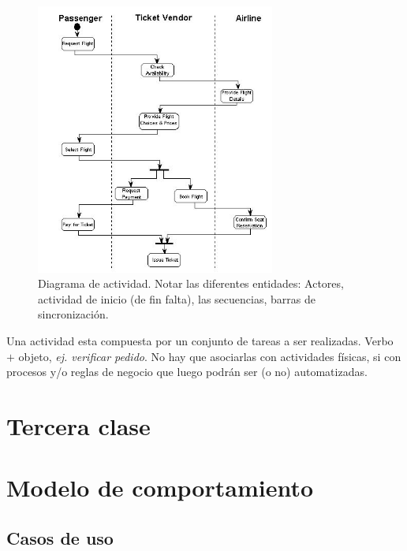 \documentclass[titlepage,a4paper]{article}
\begin{document}
    \begin{figure}[!htb]
        \centering
        \includegraphics[width=0.7\textwidth]{Imagenes/DiagramaActividad.png}
        \caption{Diagrama de actividad. Notar las diferentes entidades: Actores, actividad de inicio (de fin falta), las secuencias, barras de sincronización.}
    \end{figure}

Una actividad esta compuesta por un conjunto de tareas a ser realizadas. Verbo $+$ objeto, \textit{ej. verificar pedido}. No hay que asociarlas con actividades físicas, si con procesos y/o reglas de negocio que luego podrán ser (o no) automatizadas.



\section*{Tercera clase}

\section{Modelo de comportamiento}
\subsection*{Casos de uso}
\end{document}
